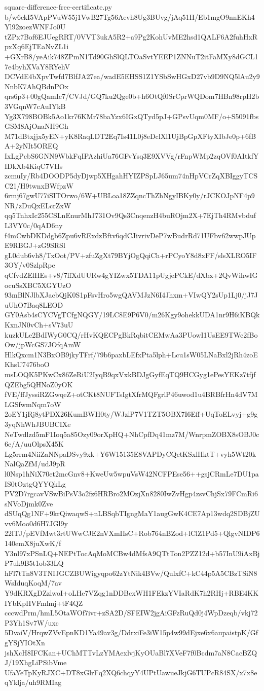 \documentclass[11pt]{article}
\theoremstyle{definition}
\theoremstyle{remark}
\begin{document}
\begin{filecontents*}[overwrite]{square-difference-free-certificate.py}
b/w6ckI5VApPVuW55j1VwB27Tg56Aevh8Ug3BUvg/jAq51H/Eb1mgO9nnEKh4Yl92zoezWNFJo0U
tZPx7Bof6EJUegRRT/0VVT3ukA5R2+a9Pg2KohUvME2hsd1QALF6A2fuhHxRpxXq6EjTEaNvZL1i
+GXrB8/yeAik748ZPmN1Td90GhSlQLTOaSvtYEEP1ZNNuT2itFaMXy8dGCL17e4byhXVaY8RYehV
DCVdE4bXpvTwfd7BlfJA27ea/wadE5EHSS1Z1YSbSwHGxD27vb9D9NQ5lAu2y9NnbK7AhQBdnPOx
qrs6p3+00gQamIc7/CVJd/GQ7ku2Qge0b+h6OtQf0SrCprWQDom7HBn98rpH2b3VGqnW7cAuIYkB
Yg3X798BOBk5Ao1kr76KMr78baYzx6IGxQTyd5pJ+GPsvUqm0MF/o+S5091fbsGSM8AjOnaNH9Gh
M71dBtxjjx5yEN+yK8RaqLDT2Eq7Is41L0j8eDclXl1UjBpGpXFtyXIbJe0p+6fBA+2yNIt5OREQ
IxLgPcbS6GNN9WbkFqIPAzhiUa76GFvYsq3E9XVVg/rFnpWMp2zqOVf0AItkfYIDkXb4KiqC7VHs
zcmuIy/Rb4DOODP5dyDjwp5XHgahHYIZPSpLJ65um74nHpVCrZqXBIggyTCSC21/H9twnxBWfpzW
6rmj67gwU77iSITOrwo/6W+UBLoa18ZZqncThZhNgyIBKy0y/rJCKOJpNF4p9NR/zDuQxELcrZxW
qq5TnhxIc255CSLnEnurMhJ731Ov9Qs3CnqenzH4buROjm2X+7EjTh4RMvbdufL3VY0c/0qAD6ny
f4mCwbDKDdgb6Zpu6vRExdzBftv6qdCJivrivDeP7wBudrRd71UFbv62wwpJUpE9RBGJ+zG9SRSl
gL0dub6vh8/TxOot/PV+zfuZgXt79BYjOgQqiCh+rPCyoY8d8xFF/slsXLRO5IF3OY/v0SzlpRpe
qCfvdZElHEs+v8/7ffXdUURw4gYIZwx5TDA11pUgjePCkE/dXbx+2QvWihwIGocuSsXBC5XGYUzO
93mBlNJlbXJacbQjK0S1pFsvHro5wgQAVMJzN6I4Jhxm+VIwQY2sUp1Lj0/jJ7JuUhO7Baq8LEOD
GY0Asb4sCYCVgTCfgNQGY/19LC8E9P6V0/m26Kgy9ohekkUDA1nr9H6iKBQkKxnJN0vCh+sV73uU
kuzkULe2BdIWyG0CQ/rHvKQECPgBkRqbitCEMwAa3PUowI1UsEE9TWc2fBoOw/jpWcGS7JOfqAmW
HlkQxcm1N3BxOB9jkyTFrf/79b6paxbLEfxPta5lph+Lcu1sW05LNaBxl2jRh4zoEKhsU7476boO
msLOQK5PKwCx86ZeRiU2IyqB9qxVxkBDJgGyfEqTQ9HCGyg1ePesYEKz7tfjfQZEbg5QHNoZ0yOK
fVE/ffJyssiRZGwqeZ+otCKt8NUFTsIgtXfrMQFgrlP46uwod1u4BRBfrHn4dV7MLGSfwmNqm7oW
2oEY1jRj8ytPDX26KumBWH0ty/WJzlP7V1TZT5OBX7I6Eff+UqToELvyj+g9g3yqNhWhJBUBCIXe
NeTwdlzd5mF1Ioq5a85Ozy09orXpHQ+NhCpfDq41mz7M/WnrpmZOBX8sOBJ0c6e/A/uuOlpsX45K
Lg5rrm4NiiZaNNpaDSvy9xk+Y6W15135E8VAPDyCQctKSxlHktT+vyh5Wt20kNalQaZfM/udJ9pR
l0Nsp1hNiX70et2mcGnv8+KweUw5wpuVsW42NCFPEse56++gsjCRmLe7DU1paIS0tOztgQYYQkLg
PV2D7rgcavVSwBiPsV3o2fz6HRBro2MOzjXn8280IwZvHgp4zsvChjSx79FCmRi6sNVoDjmk0Zve
dSUqQg1NF+9krQiwaqwS+nLBSqbTIgngMaY1augGwK4CE7Ap13wdq2SDBjZUvv6Moo0d6H7JGl9y
22lTJ/pEVfMwt3rtUWwCJE2nVXmIIsC+Rob764nBZod+lClZ1Pd5+QlgvNIDP6140emX8juXwK/f
Y3nl97xPSnLQ+NEPtTocAqMoMCBw4dMfsA9QTtTon2PZZ12d+b57InU9iAxBjP7uk9B5t1ob33LQ
hFl7tTn8V3TNIJGCZBUWigyqpo62zYtNik4BVw/QulxfC+kC44p5A5CBzTSiN8WsIduqKoqM/7av
Y9dKRXgDZzlwoI+oLHe7VZqg1nDDBcxWH1FEkzYVIaRdK7h2RHj+RBE4KKIYbKpHVFmlmj+tF4QZ
cccwdPrm/hmL5OtaWOf7ivr+zSA2D/SFEIW2jgAiGFzRuQd0j4WpDzeqb/vkj72P3Yh1Sv7W/uxc
5DvaiV/HrqwZVvEpnKD1Ya49av3g/DdrxiFe3iW15p4w99dEjxe6x6aupaistpK/GfgYSjYIOtXn
jshXcH8IFCKan+UChMTTvLzYMAexlvjKyOUaBl7XVeF7f0Bcdm7aN8CacBZQJ/19XhgLiPSibVme
UfaYeTpKyRJXC+DT8xGlrFq2XQ6chqyY4UPtUawueJkjG6TUPcR84SX/x7x8eqYklja/uh9RMIag

\end{filecontents*}
\end{document}

